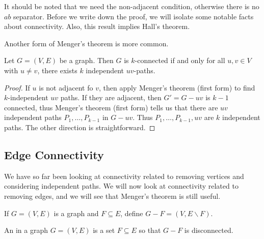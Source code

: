 \documentclass[a4paper]{scrartcl}
\begin{document}
\begin{remark}
	It should be noted that we need the non-adjacent condition, otherwise there is no $ab$ separator. Before we write down the proof, we will isolate some notable facts about connectivity.
	Also, this result implies Hall's theorem.
\end{remark}

Another form of Menger's theorem is more common.

\begin{theorem}
	Let $G = (V, E)$ be a graph. Then $G$ is $k$-connected if and only for all $u, v \in V$ with $u \neq v$, there exists $k$ independent $uv$-paths.
\end{theorem}
\begin{proof}
	If $u$ is not adjacent fo $v$, then apply Menger's theorem (first form) to find $k$-independent $uv$ paths. If they are adjacent, then $G' = G - uv$ is $k - 1$ connected, thus Menger's theorem (first form) tells us that there are $uv$ independent paths $P_1, \dots, P_{k - 1}$ in $G - uv$. Thus $P_1, \dots, P_{k - 1}, uv$ are $k$ independent paths. The other direction is straightforward. 
\end{proof}

\subsection{Edge Connectivity}

We have so far been looking at connectivity related to removing vertices and considering independent paths. We will now look at connectivity related to removing edges, and we will see that Menger's theorem is still useful.

\begin{notation}
	If $G = (V, E)$ is a graph and $F \subseteq E$, define $G - F = (V, E \backslash F)$.
\end{notation}

\begin{definition}
	An  in a graph $G = (V, E)$ is a set $F \subseteq E$ so that $G - F$ is disconnected.
\end{definition}
\end{document}
